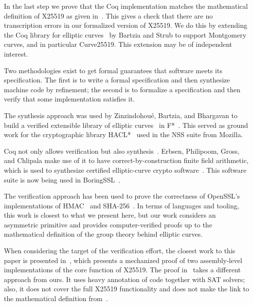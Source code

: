 In the last step we prove that the Coq implementation matches
the mathematical definition of X25519 as given in~\cite[Sec.~2]{Ber06}.
This gives a check that there are no transcription errors
in our formalized version of X25519.
We do this by extending the Coq library
for elliptic curves~\cite{BartziaS14} by Bartzia and Strub to
support Montgomery curves, and in particular Curve25519.
This extension may be of independent interest.

Two methodologies exist to get formal guarantees that software meets its specification.
The first is to write a formal specification and then synthesize
machine code by refinement; the second is to formalize
a specification and then verify that some
implementation satisfies it.

The synthesis approach was used by Zinzindohou{\'{e}}, Bartzia, and Bhargavan to build a verified extensible
library of elliptic curves~\cite{Zinzindohoue2016AVE} in F*~\cite{DBLP:journals/corr/BhargavanDFHPRR17}.
This served as ground work for the cryptographic library HACL*~\cite{zinzindohoue2017hacl}
used in the NSS suite from Mozilla.

Coq not only allows verification but also synthesis~\cite{CpdtJFR}.
Erbsen, Philipoom, Gross, and Chlipala make use of it to have
correct-by-construction finite field arithmetic, which is used
to synthesize certified elliptic-curve crypto software~\cite{Philipoom2018CorrectbyconstructionFF,Erbsen2017CraftingCE,Erbsen2016SystematicSO}.
This software suite is now being used in BoringSSL~\cite{fiat-crypto}.

The verification approach has been used to prove the correctness of OpenSSL's
implementations of HMAC~\cite{Beringer2015VerifiedCA} and SHA-256~\cite{2015-Appel}.
In terms of languages and tooling, this work is closest to what we present here,
but our work considers an asymmetric primitive and provides computer-verified
proofs up to the mathematical definition of the group theory behind elliptic curves.

When considering the target of the verification effort, the closest work
to this paper is presented in~\cite{Chen2014VerifyingCS}, which presents
a mechanized proof of two assembly-level implementations of the core function of X25519.
The proof in~\cite{Chen2014VerifyingCS} takes a different approach from ours.
It uses heavy annotation of code together with SAT solvers;
also, it does not cover the full X25519 functionality and does
not make the link to the mathematical definition from~\cite{Ber06}.


